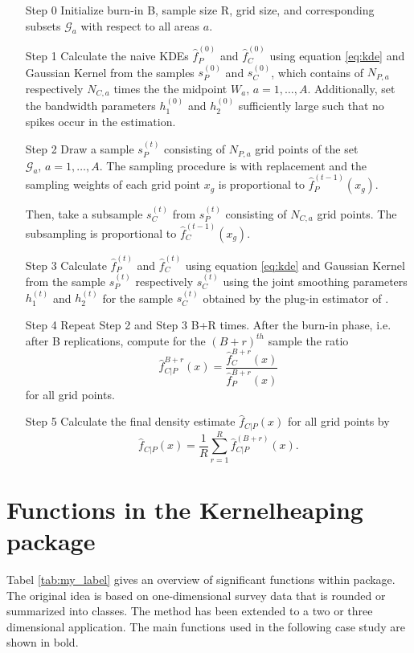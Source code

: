 \begin{itemize}
    \item[Step 0] Initialize burn-in B, sample size R, grid size, and corresponding subsets $\mathcal{G}_a$ with respect to all areas $a$.
    \item[Step 1] Calculate the naive KDEs $\hat{f}_P^{(0)}$ and $\hat{f}_C^{(0)}$ using equation \ref{eq:kde} and Gaussian Kernel from the samples $s_P^{(0)}$ and $s_C^{(0)}$, which contains of $N_{P,a}$ respectively $N_{C,a}$ times the the midpoint $W_a,\, a = 1, \dots, A$. Additionally, set the bandwidth parameters $h_1^{(0)}$ and $h_2^{(0)}$ sufficiently large such that no spikes occur in the estimation.
    \item[Step 2] Draw a sample $s_P^{(t)}$ consisting of $N_{P,a}$ grid points of the set $\mathcal{G}_a,\, a = 1, \dots, A$. The sampling procedure is with replacement and the sampling weights of each grid point $x_g$ is proportional to $\hat{f}_P^{(t-1)}(x_g)$. 

    Then, take a subsample $s_C^{(t)}$ from $s_P^{(t)}$ consisting of $N_{C,a}$ grid points. The subsampling is proportional to $\hat{f}_C^{(t-1)}(x_g)$.
    
    \item[Step 3] Calculate $\hat{f}_P^{(t)}$ and $\hat{f}_C^{(t)}$ using equation \ref{eq:kde} and Gaussian Kernel from the sample $s_P^{(t)}$ respectively $s_C^{(t)}$ using the joint smoothing parameters $h_1^{(t)}$ and $h_2^{(t)}$ for the sample $s_C^{(t)}$ obtained by the plug-in estimator of \cite{Wand94}. 
    \item[Step 4] Repeat Step 2 and Step 3 B+R times. After the burn-in phase, i.e. after B replications, compute for the $(B+r)^{th}$ sample the ratio $$ \hat{f}_{C|P}^{B+r}(x) = \frac{\hat{f}_{C}^{B+r}(x)}{\hat{f}_{P}^{B+r}(x)} $$ for all grid points. 
    \item[Step 5] Calculate the final density estimate $\hat{f}_{C|P}(x)$ for all grid points by
    $$ \hat{f}_{C|P}(x) = \frac{1}{R} \sum_{r = 1}^R \hat{f}_{C|P}^{(B+r)}(x).$$
\end{itemize}

\section{Functions in the Kernelheaping package}
Tabel \ref{tab:my_label} gives an overview of significant functions within \hyperlink{https://cran.r-project.org/web/packages/Kernelheaping/index.html}{} package. The original idea is based on one-dimensional survey data that is rounded or summarized into classes. The method has been extended to a two or three dimensional application. The main functions used in the following case study are shown in bold. 

